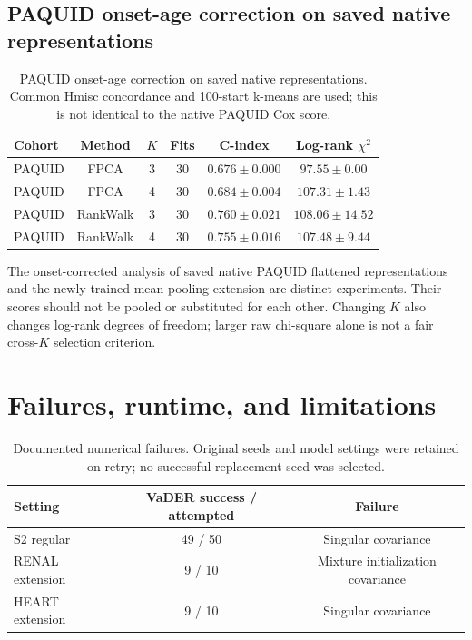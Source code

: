 \documentclass[11pt,a4paper]{article}
\begin{document}
\subsection{PAQUID onset-age correction on saved native representations}

\begin{table}[htbp]
\centering\small
\caption{PAQUID onset-age correction on saved native representations. Common Hmisc concordance and 100-start k-means are used; this is not identical to the native PAQUID Cox score.}
\begin{tabular}{lccccc}\toprule
Cohort & Method & $K$ & Fits & C-index & Log-rank $\chi^2$ \\ \midrule
PAQUID & FPCA & 3 & 30 & $0.676 \pm 0.000$ & $97.55 \pm 0.00$ \\
PAQUID & FPCA & 4 & 30 & $0.684 \pm 0.004$ & $107.31 \pm 1.43$ \\
PAQUID & RankWalk & 3 & 30 & $0.760 \pm 0.021$ & $108.06 \pm 14.52$ \\
PAQUID & RankWalk & 4 & 30 & $0.755 \pm 0.016$ & $107.48 \pm 9.44$ \\
\bottomrule\end{tabular}
\end{table}

The onset-corrected analysis of saved native PAQUID flattened representations and the newly trained mean-pooling extension are distinct experiments. Their scores should not be pooled or substituted for each other. Changing $K$ also changes log-rank degrees of freedom; larger raw chi-square alone is not a fair cross-$K$ selection criterion.

\clearpage\section{Failures, runtime, and limitations}

\begin{table}[htbp]
\centering\small
\caption{Documented numerical failures. Original seeds and model settings were retained on retry; no successful replacement seed was selected.}
\begin{tabular}{lcc}\toprule
Setting & VaDER success / attempted & Failure \\ \midrule
S2 regular & 49 / 50 & Singular covariance \\
RENAL extension & 9 / 10 & Mixture initialization covariance \\
HEART extension & 9 / 10 & Singular covariance \\
\bottomrule\end{tabular}
\end{table}
\end{document}
